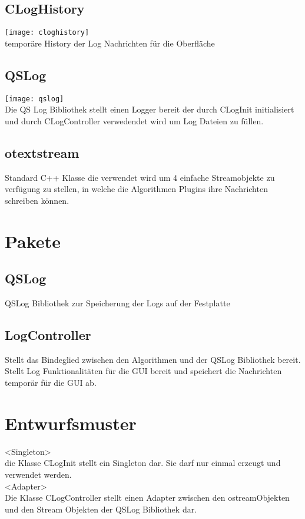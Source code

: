 \subsection{CLogHistory}\label{Logger: CLogHistory}
\texttt{[image: cloghistory]}\\
temporäre History der Log Nachrichten für die Oberfläche 
\beginMembers
{}
\closeMembers
\subsection{QSLog}\label{Logger: QSLog}
\texttt{[image: qslog]}\\
Die QS Log Bibliothek stellt einen Logger bereit der durch CLogInit initialisiert und durch CLogController verwedendet wird um Log Dateien zu füllen.

\subsection{otextstream}\label{Logger: otextstream}
Standard C++ Klasse die verwendet wird um 4 einfache Streamobjekte zu verfügung zu stellen, in welche die Algorithmen Plugins ihre Nachrichten schreiben können.
\section{Pakete}
\subsection{QSLog}
QSLog Bibliothek zur Speicherung der Logs auf der Festplatte
\subsection{LogController}
Stellt das Bindeglied zwischen den Algorithmen und der QSLog Bibliothek bereit.
Stellt Log Funktionalitäten für die GUI bereit und speichert die Nachrichten temporär für die GUI ab.
\section{Entwurfsmuster}
<Singleton>
\\die Klasse CLogInit stellt ein Singleton dar. Sie darf nur einmal erzeugt und verwendet werden.
\\<Adapter>
\\Die Klasse CLogController stellt einen Adapter zwischen den ostreamObjekten und den Stream Objekten der QSLog Bibliothek dar.

